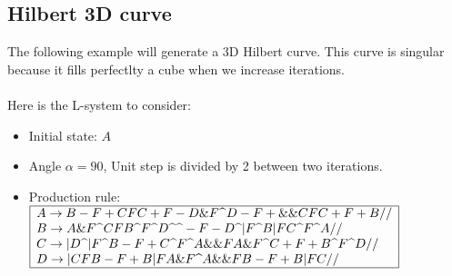 \subsection{Hilbert 3D curve}
\noindent The following example will generate a 3D Hilbert curve. This curve is singular because it fills perfectlty a cube when we increase iterations.\\ \\
Here is the L-system to consider:
\begin{itemize}
 \item Initial state: $A$
 \item Angle $\alpha=90$\degre, Unit step is divided by 2 between two iterations.\\
 \item Production rule: $\begin{array}{|l|}
\hline
A\rightarrow B-F+CFC+F-D\&F \textrm{\textrm{\textasciicircum}} D-F+\&\&CFC+F+B// \\
B\rightarrow A\&F\textrm{\textrm{\textasciicircum}} CFB\textrm{\textasciicircum} F \textrm{\textasciicircum} D\textrm{\textasciicircum} \textrm{\textasciicircum}-F-D\textrm{\textasciicircum}|F\textrm{\textasciicircum} B|FC\textrm{\textasciicircum} F\textrm{\textasciicircum} A// \\
C\rightarrow|D\textrm{\textasciicircum}|F\textrm{\textasciicircum} B-F+C\textrm{\textasciicircum} F\textrm{\textasciicircum} A\&\&FA\&F\textrm{\textasciicircum} C+F+B\textrm{\textasciicircum} F\textrm{\textasciicircum} D// \\
D\rightarrow|CFB-F+B|FA\&F\textrm{\textasciicircum} A\&\&FB-F+B|FC// \\
\hline
\end{array}$
\end{itemize}
